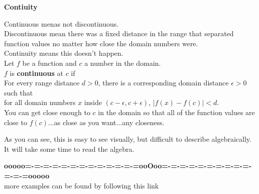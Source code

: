 \documentclass{ximera}
\begin{document}
\begin{idea} \textbf{Contiuity}


Continuous menas not discontinuous. \\

Discontinuous mean there was a fixed distance in the range that separated function values no matter how close the domain numbers were. \\

Continuity means this doesn't happen. \\


Let $f$ be a function and $c$ a number in the domain. \\

$f$ is \textbf{continuous} at $c$ if  \\


For every range distance $d > 0 $, there is a corresponding domain distance $\epsilon > 0$ such that \\


for all domain numbers $x$ inside $(c - \epsilon, c + \epsilon)$, $| f(x) - f(c) | < d$. \\


You can get close enough to $c$ in the domain so that all of the function values are close to $f(c)$...as close as you want...any closeness.


\end{idea}


As you can see, this is easy to see visually, but difficult to describe algebraically.  It will take some time to read the algebra.










\begin{center}
\textbf{\textcolor{green!50!black}{ooooo=-=-=-=-=-=-=-=-=-=-=-=-=ooOoo=-=-=-=-=-=-=-=-=-=-=-=-=ooooo}} \\

more examples can be found by following this link\\ 

\end{center}
\end{document}
